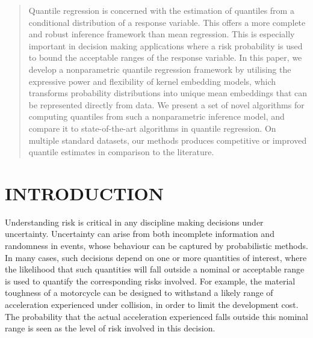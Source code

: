 \documentclass[twoside]{article} \usepackage{aistats2017}
\theoremstyle{definition}
\theoremstyle{theorem}
\begin{document}
%

%


\begin{abstract}

	Quantile regression is concerned with the estimation of quantiles from a conditional distribution of a response variable. This offers a more complete and robust inference framework than mean regression. This is especially important in decision making applications where a risk probability is used to bound the acceptable ranges of the response variable. In this paper, we develop a nonparametric quantile regression framework by utilising the expressive power and flexibility of kernel embedding models, which transforms probability distributions into unique mean embeddings that can be represented directly from data. We present a set of novel algorithms for computing quantiles from such a nonparametric inference model, and compare it to state-of-the-art algorithms in quantile regression. On multiple standard datasets, our methods produces competitive or improved quantile estimates in comparison to the literature.

\end{abstract}

\section{INTRODUCTION}
\label{sec:introduction}

	Understanding risk is critical in any discipline making decisions under uncertainty. Uncertainty can arise from both incomplete information and randomness in events, whose behaviour can be captured by probabilistic methods. In many cases, such decisions depend on one or more quantities of interest, where the likelihood that such quantities will fall outside a nominal or acceptable range is used to quantify the corresponding risks involved. For example, the material toughness of a motorcycle can be designed to withstand a likely range of acceleration experienced under collision, in order to limit the development cost. The probability that the actual acceleration experienced falls outside this nominal range is seen as the level of risk involved in this decision. 
\end{document}
